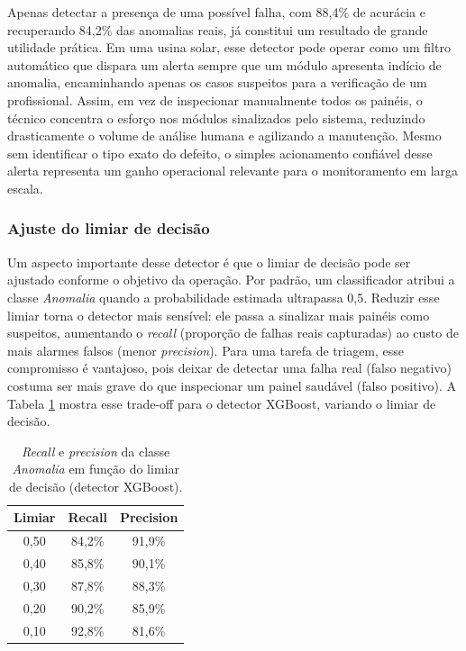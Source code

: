 \documentclass[a4paper,11pt]{article}
\begin{document}
Apenas detectar a presença de uma possível falha, com 88,4\% de acurácia e recuperando 84,2\% das anomalias reais, já constitui um resultado de grande utilidade prática. Em uma usina solar, esse detector pode operar como um filtro automático que dispara um alerta sempre que um módulo apresenta indício de anomalia, encaminhando apenas os casos suspeitos para a verificação de um profissional. Assim, em vez de inspecionar manualmente todos os painéis, o técnico concentra o esforço nos módulos sinalizados pelo sistema, reduzindo drasticamente o volume de análise humana e agilizando a manutenção. Mesmo sem identificar o tipo exato do defeito, o simples acionamento confiável desse alerta representa um ganho operacional relevante para o monitoramento em larga escala.

\subsubsection{Ajuste do limiar de decisão}

Um aspecto importante desse detector é que o limiar de decisão pode ser ajustado conforme o objetivo da operação. Por padrão, um classificador atribui a classe \textit{Anomalia} quando a probabilidade estimada ultrapassa 0,5. Reduzir esse limiar torna o detector mais sensível: ele passa a sinalizar mais painéis como suspeitos, aumentando o \textit{recall} (proporção de falhas reais capturadas) ao custo de mais alarmes falsos (menor \textit{precision}). Para uma tarefa de triagem, esse compromisso é vantajoso, pois deixar de detectar uma falha real (falso negativo) costuma ser mais grave do que inspecionar um painel saudável (falso positivo). A Tabela \ref{tab:limiar} mostra esse trade-off para o detector XGBoost, variando o limiar de decisão.

\begin{table}[H]
	\centering
	\caption{\textit{Recall} e \textit{precision} da classe \textit{Anomalia} em função do limiar de decisão (detector XGBoost).}
	\label{tab:limiar}
	\vspace{0.2cm}
	\renewcommand{\arraystretch}{1.2}
	\begin{tabular}{c c c}
		\hline
		\textbf{Limiar} & \textbf{Recall} & \textbf{Precision} \\
		\hline
		0,50 & 84,2\% & 91,9\% \\ \hline
		0,40 & 85,8\% & 90,1\% \\ \hline
		0,30 & 87,8\% & 88,3\% \\ \hline
		0,20 & 90,2\% & 85,9\% \\ \hline
		0,10 & 92,8\% & 81,6\% \\
		\hline
	\end{tabular}
\end{table}
\end{document}
